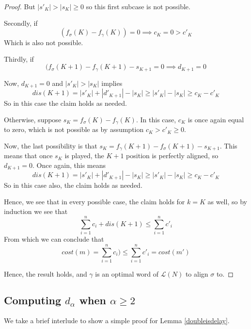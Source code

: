 \documentclass[runningheads]{llncs}
\begin{document}
\begin{proof}
But $|s'_K| >|s_K| \geq 0 $ so this first subcase is not possible. 

Secondly, if $$(f_\sigma(K) - f_\gamma(K)) = 0 \implies c_K = 0 > c'_K$$ Which is also not possible. 

Thirdly, if $$(f_\sigma(K+1) - f_\gamma(K+1) - s_{K+1} = 0 \implies d_{K+1} = 0 $$

Now, $d_{K+1} = 0 $ and $|s'_K| > |s_K|$ implies $$dis(K+1) = |s'_K| + |d'_{K+1}| - |s_K| \geq |s'_K|  - |s_K| \geq c_K - c'_K$$ So in this case the claim holds as needed. 

Otherwise, suppose $s_K = f_\sigma(K) - f_\gamma(K)$. In this case, $c_K$ is once again equal to zero, which is not possible as by assumption $c_K > c'_K \geq 0$. 

Now, the last possibility is that $s_K = f_\gamma(K+1) - f_\sigma(K+1) -s_{K+1}$. This means that once $s_K$ is played, the $K+1$ position is perfectly aligned, so $d_{K+1} = 0$. Once again, this means $$dis(K+1) = |s'_K| + |d'_{K+1}| - |s_K| \geq |s'_K|  - |s_K| \geq c_K - c'_K$$ So in this case also, the claim holds as needed. 

Hence, we see that in every possible case, the claim holds for $k= K$ as well, so by induction we see that $$\sum_{i = 1}^{n} c_i + dis(K+1) \leq \sum_{i = 1}^{n} c'_i$$ From which we can conclude that $$cost(m) = \sum_{i = 1}^{n} c_i ) \leq \sum_{i = 1}^{n} c'_i = cost(m')$$

Hence, the result holds, and $\gamma$ is an optimal word of $\mathcal{L}(N)$ to align $\sigma$ to. 

\end{proof}
\subsection{Computing $d_{\alpha}$ when $\alpha \geq 2$}
We take a brief interlude to show a simple proof for Lemma \ref{doubleisdelay}. 
\end{document}
